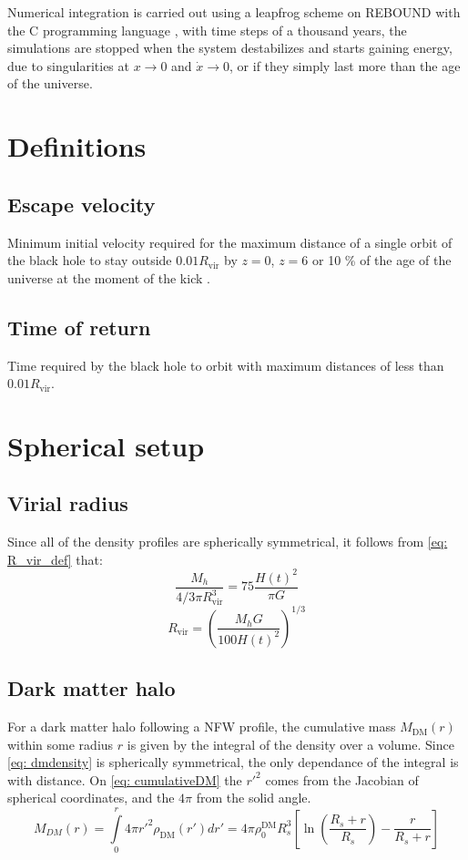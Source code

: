 		Numerical integration is carried out using a leapfrog scheme on REBOUND with the C programming language \cite{larson2017modeling}, with time steps of a thousand years, the simulations are stopped when the system destabilizes and starts gaining energy, due to singularities at $x \rightarrow 0$ and $\dot{x} \rightarrow 0$, or if they simply last more than the age of the universe. 
		
	\section{Definitions}
		\subsection{Escape velocity}
			Minimum initial velocity required for the maximum distance of a single orbit of the black hole to stay outside $0.01R_\text{vir}$ by $z = 0$, $z = 6$ or 10 \% of the age of the universe at the moment of the kick \cite{tanaka2009assembly, choksi2017recoiling}.
		
		\subsection{Time of return}
			Time required by the black hole to orbit with maximum distances of less than  $0.01R_\text{vir}$.
			
	\section{Spherical setup}
	\subsection{Virial radius}
		Since all of the density profiles are spherically symmetrical, it follows from \autoref{eq: R_vir_def} that:  
		\begin{equation}
		\dfrac{M_h}{4/3\pi R_\text{vir}^3} = 75\dfrac{H(t)^2}{\pi G}
		\end{equation}
		\begin{equation}
		R_\text{vir} = \left({\dfrac{M_hG}{100 H(t)^2}}\right)^{1/3}
		\end{equation}
	
	\subsection{Dark matter halo}
		For a dark matter halo following a NFW profile, the cumulative mass $M_\text{DM}(r)$ within some radius $r$ is given by the integral of the density over a volume. Since \autoref{eq: dmdensity} is spherically symmetrical, the only dependance of the integral is with distance. On \autoref{eq: cumulativeDM} the $r'^2$ comes from the Jacobian of spherical coordinates, and the $4\pi$ from the solid angle.
		\begin{equation}\label{eq: cumulativeDM}
			M_{DM}(r) = \int\limits_0^{r} 4\pi {r'}^2\rho_\text{DM}(r')dr' = 4\pi\rho_0^\text{DM}R_s^3\left[\ln\left(\dfrac{R_s + r}{R_s}\right) - \dfrac{r}{R_s + r}\right]
		\end{equation}
		
